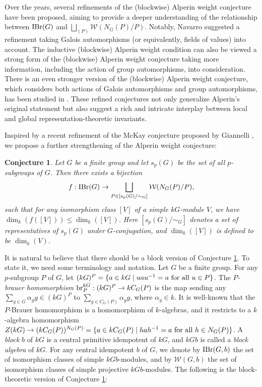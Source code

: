 \documentclass[preprint,12pt,3p]{elsarticle}
\newtheorem{conjecture}[theorem]{Conjecture}
\def\IBr{{\rm IBr}}
\def\br{{\rm br}}
\def\W{\mathcal{W}}
\begin{document}
Over the years, several refinements of the (blockwise) Alperin weight conjecture have been proposed, aiming to provide a deeper understanding of the relationship between $\IBr(G)$ and $\bigsqcup_{(P)}\W(N_G(P)/P)$. Notably, Navarro \cite{Nav04} suggested a refinement taking Galois automorphisms (or equivalently, fields of values) into account. The inductive (blockwise) Alperin weight condition \cite{NT, Spa} can also be viewed a strong form of the (blockwise) Alperin weight conjecture taking more information, including the action of group automorphisms, into consideration. There is an even stronger version of the (blockwise) Alperin weight conjecture, which considers both actions of Galois automorphisms and group automorphisms, has been studied in \cite{DH,DHZ,FFZ1,FFZ2,H26}. These refined conjectures not only generalize Alperin's original statement but also suggest a rich and intricate interplay between local and global representation-theoretic invariants.

Inspired by a recent refinement of the McKay conjecture proposed by Giannelli \cite{G}, we propose a further strengthening of the Alperin weight conjecture:

\begin{conjecture}\label{conj: non-block version}
Let $G$ be a finite group and let $s_p(G)$ be the set of all $p$-subgroups of $G$. Then there exists a bijection
$$f:\IBr(G)\to\bigsqcup_{P\in [s_p(G)/\sim_G]}\W(N_G(P)/P),$$
such that for any isomorphism class $[V]$ of a simple $kG$-module $V$, we have $\dim_k(f([V]))\leq \dim_k([V])$. Here $[s_p(G)/\sim_G]$ denotes a set of representatives of $s_p(G)$ under $G$-conjugation, and $\dim_k([V])$ is defined to be $\dim_k(V)$.
\end{conjecture}

It is natural to believe that there should be a block version of Conjecture \ref{conj: non-block version}. To state it, we need some terminology and notation. Let $G$ be a finite group. For any $p$-subgroup $P$ of $G$, let $(kG)^P=\{a\in kG\mid uau^{-1}=a~{\rm for~all}~u\in P\}$. The {\it $P$-brauer homomorphism} $\br_P^{kG}:(kG)^P\to kC_G(P)$ is the map sending any $\sum_{g\in G}\alpha_gg \in (kG)^P$ to $\sum_{g\in C_G(P)}\alpha_gg$, where $\alpha_g\in k$. It is well-known that the $P$-Brauer homomorphism is a homomorphism of $k$-algebras, and it restricts to a $k$-algebra homomorphism $Z(kG)\to (kC_G(P))^{N_G(P)}=\{a\in kC_G(P)\mid hah^{-1}=a~{\rm for~all}~h\in N_G(P)\}$. A {\it block} $b$ of $kG$ is a central primitive idempotent of $kG$, and $kGb$ is called a {\it block algebra} of $kG$. For any central idempotent $b$ of $G$, we denote by $\IBr(G,b)$ the set of isomorphism classes of simple $kGb$-modules, and by $\W(G,b)$ the set of isomorphism classes of simple projective $kGb$-modules. The following is the block-theoretic version of Conjecture \ref{conj: non-block version}:
\end{document}
